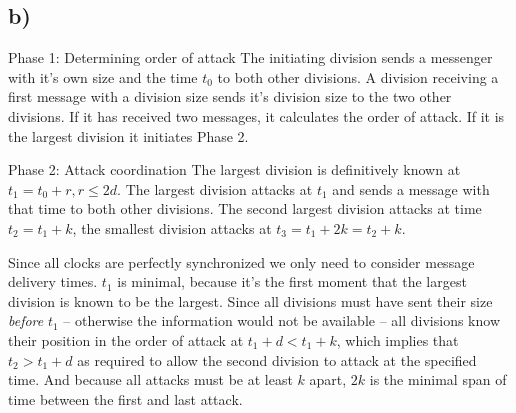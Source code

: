 \documentclass{scrartcl}
\begin{document}
\subsection*{b)}
\par{Phase 1: Determining order of attack}
The initiating division sends a messenger with it's own size and the time \(t_0\) to both other divisions.
A division receiving a first message with a division size sends it's division size to the two other divisions.
If it has received two messages, it calculates the order of attack.
If it is the largest division it initiates Phase 2.
\par{Phase 2: Attack coordination}
The largest division is definitively known at \(t_1 = t_0 + r, r \leq 2d\).
The largest division attacks at \(t_1\) and sends a message with that time to both other divisions.
The second largest division attacks at time \(t_2 = t_1 + k\), the smallest division attacks at \(t_3 = t_1 + 2k = t_2 + k\).

Since all clocks are perfectly synchronized we only need to consider message delivery times.
\(t_1\) is minimal, because it's the first moment that the largest division is known to be the largest.
Since all divisions must have sent their size \emph{before} \(t_1\) -- otherwise the information would not be available -- all divisions know their position in the order of attack at \(t_1 + d < t_1 + k\), which implies that \(t_2 > t_1 + d\) as required to allow the second division to attack at the specified time.
And because all attacks must be at least \(k\) apart, \(2k\) is the minimal span of time between the first and last attack.
\end{document}
